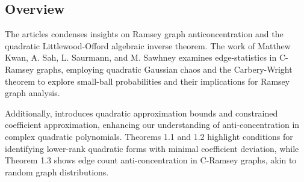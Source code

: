 \subsection{Overview}
The articles condenses insights on Ramsey graph
anticoncentration and the 
quadratic Littlewood-Offord algebraic inverse theorem.
The work of Matthew Kwan, A. Sah, L. Saurmann, and M. Sawhney
 \cite{kwan2022anticoncentration} examines edge-statistics in C-Ramsey graphs, employing quadratic Gaussian chaos and the Carbery-Wright theorem to explore small-ball probabilities and their implications for Ramsey graph analysis.

Additionally, \cite{kwan2019algebraic} introduces quadratic approximation bounds and constrained coefficient approximation, enhancing our understanding of anti-concentration in complex quadratic polynomials. Theorems 1.1 and 1.2 highlight conditions for identifying lower-rank quadratic forms with minimal coefficient deviation, while Theorem 1.3 shows
edge count anti-concentration in C-Ramsey graphs, akin to random graph distributions.

